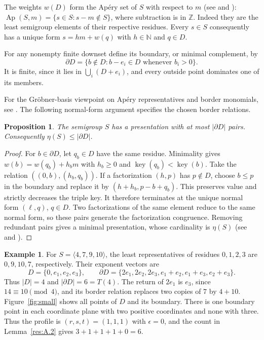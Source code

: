 \documentclass[11pt]{article}
\newtheorem{proposition}[theorem]{Proposition}
\theoremstyle{definition}
\newtheorem{example}[theorem]{Example}
\theoremstyle{remark}
\theoremstyle{plain}
\DeclareMathOperator{\Ap}{Ap}
\begin{document}
The weights $w(D)$ form the Ap\'ery set of $S$ with respect to $m$
(see \cite{Apery46} and \cite[Chapter~2]{RG09}):
$\Ap(S,m)=\{s\in S:s-m\notin S\}$, where subtraction is in
$\mathbb Z$. Indeed they are the least semigroup elements of their
respective residues. Every $s\in S$ consequently has a unique form
$s=hm+w(q)$ with $h\in\mathbb N$ and $q\in D$.

For any nonempty finite downset define its boundary, or minimal complement, by
\[
\partial D=\{b\notin D:b-e_i\in D\text{ whenever }b_i>0\}.
\]
It is finite, since it lies in $\bigcup_i(D+e_i)$, and every outside
point dominates one of its members.

For the Gr\"obner-basis viewpoint on Ap\'ery representatives and border
monomials, see \cite[Remark~2.8]{EHOOPK24}. The following normal-form
argument specifies the chosen border relations.

\begin{proposition}\label{prop:border}
The semigroup $S$ has a presentation with at most $|\partial D|$ pairs.
Consequently $\eta(S)\le|\partial D|$.
\end{proposition}
\begin{proof}
For $b\in\partial D$, let $q_b\in D$ have the same residue.
Minimality gives
$w(b)=w(q_b)+h_bm$ with $h_b\ge0$ and $\operatorname{key}(q_b)<\operatorname{key}(b)$.
Take the relation $((0,b),(h_b,q_b))$.
If a factorization $(h,p)$ has $p\notin D$, choose $b\le p$ in the
boundary and replace it by $(h+h_b,p-b+q_b)$. This preserves value
and strictly decreases the triple key. It therefore terminates at the
unique normal form $(\ell,q)$, $q\in D$. Two factorizations of the same
element reduce to the same normal form, so these pairs generate the
factorization congruence. Removing redundant pairs gives a minimal
presentation, whose cardinality is $\eta(S)$
(see \cite[Chapter~7]{RG09} and \cite[Section~2]{EHOOPK24}).
\end{proof}

\begin{example}\label{ex:small}
For $S=\langle4,7,9,10\rangle$, the least representatives of residues
$0,1,2,3$ are $0,9,10,7$, respectively. Their exponent vectors are
\[
D=\{0,e_1,e_2,e_3\},\qquad
\partial D=\{2e_1,2e_2,2e_3,e_1+e_2,e_1+e_3,e_2+e_3\}.
\]
Thus $|D|=4$ and $|\partial D|=6=T(4)$. The return of $2e_1$ is
$e_3$, since $14\equiv10\pmod4$, and its border relation replaces
two copies of $7$ by $4+10$. Figure~\ref{fig:small} shows all points
of $D$ and its boundary. There is one boundary point in each coordinate
plane with two positive coordinates and none with three. Thus the
profile is $(r,s,t)=(1,1,1)$ with $\epsilon=0$, and the count in
Lemma~\ref{res:A.2} gives $3+1+1+1+0=6$.
\end{example}
\end{document}
